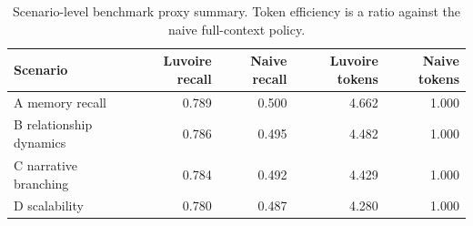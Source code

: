 \begin{table}[h]
\centering
\begin{tabular}{lrrrr}
\toprule
Scenario & Luvoire recall & Naive recall & Luvoire tokens & Naive tokens \\
\midrule
A memory recall & 0.789 & 0.500 & 4.662 & 1.000 \\
B relationship dynamics & 0.786 & 0.495 & 4.482 & 1.000 \\
C narrative branching & 0.784 & 0.492 & 4.429 & 1.000 \\
D scalability & 0.780 & 0.487 & 4.280 & 1.000 \\
\bottomrule
\end{tabular}
\caption{Scenario-level benchmark proxy summary. Token efficiency is a ratio against the naive full-context policy.}
\label{tab:benchmark-summary}
\end{table}
